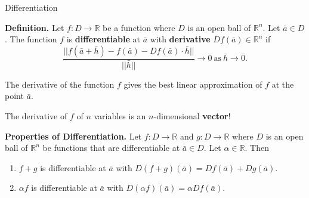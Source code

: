 \documentclass[aspectratio=169, UTF8]{ctexbeamer}
\begin{document}
    \begin{frame}[t]{Differentiation}
        \begin{block}
            \par \textbf{Definition.} Let $f: D \to \mathbb{R}$ be a function where $D$ is an open ball of $\mathbb{R}^n$. Let $\bar{a} \in D$. The function $f$ is \textbf{differentiable} at $\bar{a}$ with \textbf{derivative} $Df(\bar{a}) \in \mathbb{R}^n$ if 
            \begin{equation*}
                \dfrac{|| f(\bar{a} + \bar{h}) - f(\bar{a}) - D f(\bar{a}) \cdot \bar{h}||}{||\bar{h}||} \to 0\ \text{as} \ \bar{h} \to \bar{0} .
            \end{equation*}
        \end{block}


        \par The derivative of the function $f$ gives the best linear approximation of $f$ at the point $\bar{a}$.

        \par The derivative of $f$ of $n$ variables is an $n$-dimensional \textbf{vector}!

        \begin{block}
            \par \textbf{Properties of Differentiation.} Let $f: D \to \mathbb{R}$ and $g: D \to \mathbb{R}$ where $D$ is an open ball of $\mathbb{R}^n$ be functions that are differentiable at $\bar{a} \in D$. Let $\alpha \in \mathbb{R}$. Then 
            \begin{enumerate}
                \item $f + g$ is differentiable at $\bar{a}$ with $D(f+g) (\bar{a}) = Df(\bar{a}) + Dg (\bar{a})$.
                \item $\alpha f$ is differentiable at $\bar{a}$ with $D(\alpha f) (\bar{a}) = \alpha D f(\bar{a})$.
            \end{enumerate}
        \end{block}
    \end{frame}
\end{document}
